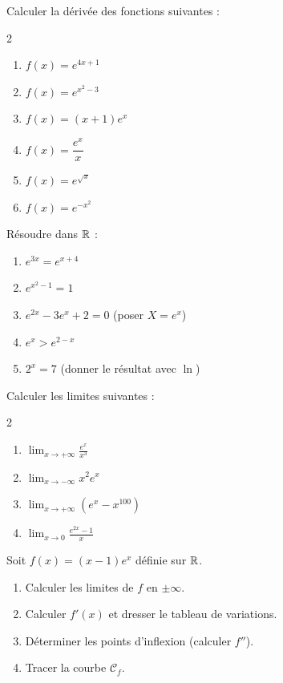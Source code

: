 \begin{exercice}[2 : D\'{e}riv\'{e}es]
  Calculer la d\'{e}riv\'{e}e des fonctions suivantes :
  \begin{multicols}{2}
  \begin{enumerate}
    \item $f(x) = e^{4x+1}$
    \item $f(x) = e^{x^2-3}$
    \item $f(x) = (x+1)e^x$
    \item $f(x) = \dfrac{e^x}{x}$
    \item $f(x) = e^{\sqrt{x}}$
    \item $f(x) = e^{-x^2}$
  \end{enumerate}
  \end{multicols}
\end{exercice}

\begin{exercice}
  R\'{e}soudre dans $\mathbb{R}$ :
  \begin{enumerate}
    \item $e^{3x} = e^{x+4}$
    \item $e^{x^2-1} = 1$
    \item $e^{2x} - 3e^x + 2 = 0$
          \quad (poser $X = e^x$)
    \item $e^x > e^{2-x}$
    \item $2^x = 7$ \quad (donner le r\'{e}sultat avec $\ln$)
  \end{enumerate}
\end{exercice}

\begin{exercice}[4 : Limites]
  Calculer les limites suivantes :
  \begin{multicols}{2}
  \begin{enumerate}
    \item $\displaystyle\lim_{x\to+\infty} \frac{e^x}{x^3}$
    \item $\displaystyle\lim_{x\to-\infty} x^2 e^x$
    \item $\displaystyle\lim_{x\to+\infty} (e^x - x^{100})$
    \item $\displaystyle\lim_{x\to 0} \frac{e^{2x}-1}{x}$
  \end{enumerate}
  \end{multicols}
\end{exercice}

\begin{exercice}
  Soit $f(x) = (x-1)e^x$ d\'{e}finie sur $\mathbb{R}$.
  \begin{enumerate}
    \item Calculer les limites de $f$ en $\pm\infty$.
    \item Calculer $f'(x)$ et dresser le tableau de variations.
    \item D\'{e}terminer les points d'inflexion (calculer $f''$).
    \item Tracer la courbe $\mathcal{C}_f$.
  \end{enumerate}
\end{exercice}